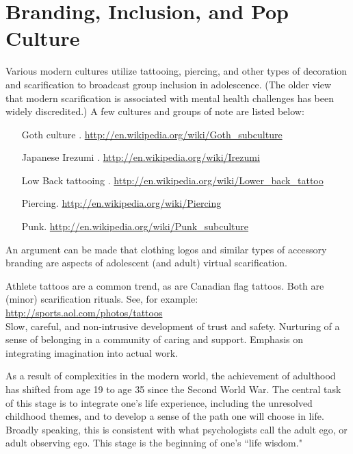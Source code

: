 \documentclass[12pt,DIV9,oneside,headsepline,footsepline]{scrreprt}
\begin{document}
\section{Branding, Inclusion, and Pop Culture}

Various modern cultures utilize tattooing, piercing, and other types
of decoration and scarification to broadcast group inclusion in
adolescence. (The older view that modern scarification is associated
with mental health challenges has been widely discredited.) A few
cultures and groups of note are listed below:

\begin{itemize}
\item [Goth culture].
\url{http://en.wikipedia.org/wiki/Goth_subculture}
\item [Japanese Irezumi]. 
\url{http://en.wikipedia.org/wiki/Irezumi}
\item [Low Back tattooing].
\url{http://en.wikipedia.org/wiki/Lower_back_tattoo}
\item [Piercing.] \url{http://en.wikipedia.org/wiki/Piercing}
\item [Punk.] \url{http://en.wikipedia.org/wiki/Punk_subculture}

\end{itemize}

An argument can be made that clothing logos and similar types of
accessory branding are aspects of adolescent (and adult) virtual
scarification. 

Athlete tattoos are a common trend, as are Canadian flag tattoos. Both
are (minor) scarification rituals. See, for example:\\

\url{http://sports.aol.com/photos/tattoos}\\



Slow, careful, and non-intrusive development of trust and safety.
Nurturing of a sense of belonging in a community of caring and
support. Emphasis on integrating imagination into actual work.

As a result of complexities in the modern world, the achievement of
adulthood has shifted from age 19 to age 35 since the Second World
War. The central task of this stage is to integrate one's life
experience, including the unresolved childhood themes, and to develop
a sense of the path one will choose in life. Broadly speaking, this is
consistent with what psychologists call the adult ego, or adult
observing ego. This stage is the beginning of one’s ``life wisdom."
\end{document}
